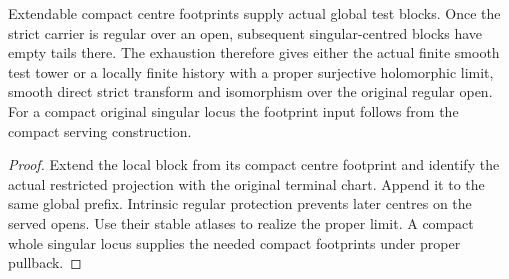 \begin{theorem}
\label{hir:g8-native-global-footprint-assembly}
\leanok
Extendable compact centre footprints supply actual global test
blocks. Once the strict carrier is regular over an open, subsequent
singular-centred blocks have empty tails there. The exhaustion
therefore gives either the actual finite smooth test tower or a
locally finite history with a proper surjective holomorphic limit,
smooth direct strict transform and isomorphism over the original
regular open. For a compact original singular locus the footprint
input follows from the compact serving construction.
\end{theorem}
\begin{proof}
Extend the local block from its compact centre footprint and
identify the actual restricted projection with the original
terminal chart. Append it to the same global prefix. Intrinsic
regular protection prevents later centres on the served opens.
Use their stable atlases to realize the proper limit. A compact
whole singular locus supplies the needed compact footprints
under proper pullback.
\end{proof}


